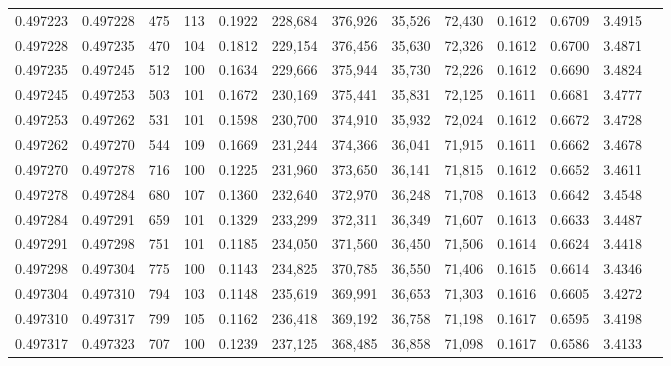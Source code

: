 \begin{tabular}{rrrrrrrrrrrrr}
0.497223 & 0.497228 &   475 & 113 &                                     0.1922 & 228,684 & 376,926 &  35,526 &  72,430 & 0.1612 & 0.6709 & 3.4915 \\
0.497228 & 0.497235 &   470 & 104 &                                     0.1812 & 229,154 & 376,456 &  35,630 &  72,326 & 0.1612 & 0.6700 & 3.4871 \\
0.497235 & 0.497245 &   512 & 100 &                                     0.1634 & 229,666 & 375,944 &  35,730 &  72,226 & 0.1612 & 0.6690 & 3.4824 \\
0.497245 & 0.497253 &   503 & 101 &                                     0.1672 & 230,169 & 375,441 &  35,831 &  72,125 & 0.1611 & 0.6681 & 3.4777 \\
0.497253 & 0.497262 &   531 & 101 &                                     0.1598 & 230,700 & 374,910 &  35,932 &  72,024 & 0.1612 & 0.6672 & 3.4728 \\
0.497262 & 0.497270 &   544 & 109 &                                     0.1669 & 231,244 & 374,366 &  36,041 &  71,915 & 0.1611 & 0.6662 & 3.4678 \\
0.497270 & 0.497278 &   716 & 100 &                                     0.1225 & 231,960 & 373,650 &  36,141 &  71,815 & 0.1612 & 0.6652 & 3.4611 \\
0.497278 & 0.497284 &   680 & 107 &                                     0.1360 & 232,640 & 372,970 &  36,248 &  71,708 & 0.1613 & 0.6642 & 3.4548 \\
0.497284 & 0.497291 &   659 & 101 &                                     0.1329 & 233,299 & 372,311 &  36,349 &  71,607 & 0.1613 & 0.6633 & 3.4487 \\
0.497291 & 0.497298 &   751 & 101 &                                     0.1185 & 234,050 & 371,560 &  36,450 &  71,506 & 0.1614 & 0.6624 & 3.4418 \\
0.497298 & 0.497304 &   775 & 100 &                                     0.1143 & 234,825 & 370,785 &  36,550 &  71,406 & 0.1615 & 0.6614 & 3.4346 \\
0.497304 & 0.497310 &   794 & 103 &                                     0.1148 & 235,619 & 369,991 &  36,653 &  71,303 & 0.1616 & 0.6605 & 3.4272 \\
0.497310 & 0.497317 &   799 & 105 &                                     0.1162 & 236,418 & 369,192 &  36,758 &  71,198 & 0.1617 & 0.6595 & 3.4198 \\
0.497317 & 0.497323 &   707 & 100 &                                     0.1239 & 237,125 & 368,485 &  36,858 &  71,098 & 0.1617 & 0.6586 & 3.4133 \\

\end{tabular}
